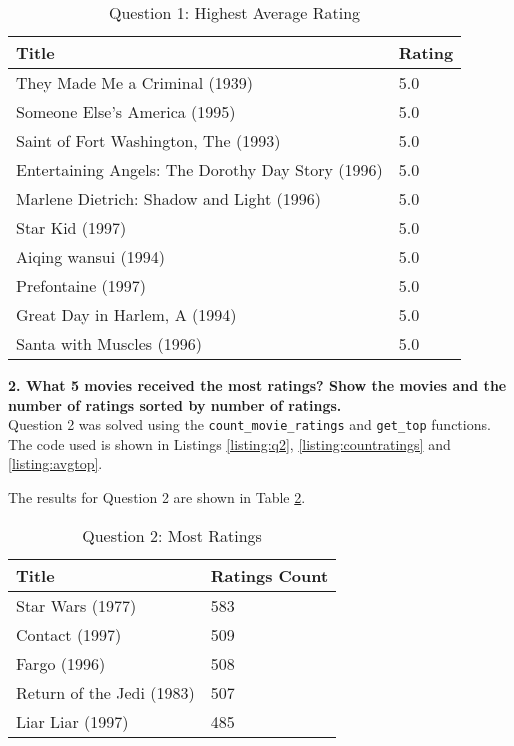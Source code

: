 \begin{table}[h!]
\centering
\begin{tabular}{| l | l |}
\hline
Title & Rating \\
\hline
They Made Me a Criminal (1939) & 5.0 \\
Someone Else's America (1995) & 5.0 \\
Saint of Fort Washington, The (1993) & 5.0 \\
Entertaining Angels: The Dorothy Day Story (1996) & 5.0 \\
Marlene Dietrich: Shadow and Light (1996)  & 5.0 \\
Star Kid (1997) & 5.0 \\
Aiqing wansui (1994) & 5.0 \\
Prefontaine (1997) & 5.0 \\
Great Day in Harlem, A (1994) & 5.0 \\
Santa with Muscles (1996) & 5.0 \\
\hline
\end{tabular}
\caption{Question 1: Highest Average Rating}
\label{tab:hiavgrat}
\end{table}

\textbf{2. What 5 movies received the most ratings? Show the movies and the number of ratings sorted by number of ratings.}\\

Question 2 was solved using the {\tt count\_movie\_ratings} and {\tt get\_top} functions. The code used is shown in Listings \ref{listing:q2}, \ref{listing:countratings} and \ref{listing:avgtop}.

\clearpage





The results for Question 2 are shown in Table \ref{tab:mratings}.

\begin{table}[h!]
\centering
\begin{tabular}{| l | l |}
\hline
Title & Ratings Count \\
\hline
Star Wars (1977) & 583 \\
Contact (1997) & 509 \\
Fargo (1996) & 508 \\
Return of the Jedi (1983) & 507 \\
Liar Liar (1997) & 485 \\
\hline
\end{tabular}
\caption{Question 2: Most Ratings}
\label{tab:mratings}
\end{table}

